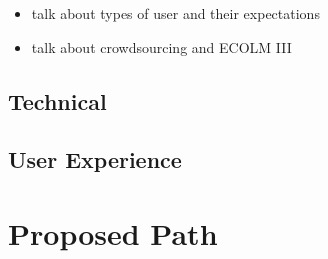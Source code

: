 \documentclass[twocolumn,10pt]{paper}
\begin{document}
\begin{sloppypar}
  \begin{itemize}
  \item talk about types of user and their expectations
  \item talk about crowdsourcing and ECOLM III
  \end{itemize}
  
  \subsection{Technical}
  \subsection{User Experience}

  \section{Proposed Path}

  
\end{sloppypar}
\end{document}
